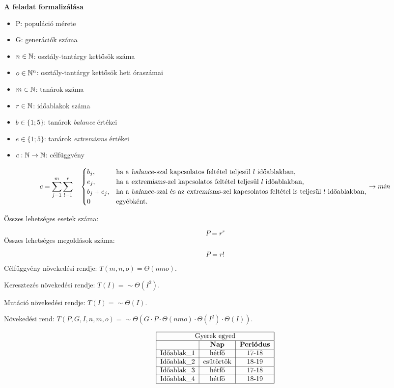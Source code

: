 \documentclass[a4paper,12pt]{article}
\begin{document}
\noindent \textbf{A feladat formalizálása}

\begin{itemize}
    \item P: populáció mérete
    \item G: generációk száma
    \item $n \in \Bbb{N}$: osztály-tantárgy kettősök száma
    \item $o \in \Bbb{N}^n$: osztály-tantárgy kettősök heti óraszámai
    \item $m \in \Bbb{N}$: tanárok száma
    \item $r \in \Bbb{N}$: időablakok száma
    \item $b \in \{1;5\}$: tanárok \textsl{balance} értékei
    \item $e \in \{1;5\}$: tanárok \textsl{extremisms} értékei
    \item $c: \Bbb{N} \rightarrow \Bbb{N}$: célfüggvény
\end{itemize}

$$ c=\sum_{j=1}^m \sum_{l=1}^r \quad
\begin{cases}
b_j, & \hbox{ha a \textsl{balance}-szal kapcsolatos feltétel teljesül }l\hbox{ időablakban,}\\
e_j, & \hbox{ha a \textsl{extremisms}-zel kapcsolatos feltétel teljesül }l\hbox{ időablakban,}\\
b_j+e_j, & \hbox{ha a \textsl{balance}-szal és az \textsl{extremisms}-zel kapcsolatos feltétel is teljesül }l\hbox{ időablakban,}\\
0 & \hbox{egyébként.}
\end{cases} 
\rightarrow min$$

Összes lehetséges esetek száma:

$$P=r^r$$
Összes lehetséges megoldások száma:

$$P=r!$$

Célfüggvény növekedési rendje: $T(m,n,o)=\Theta(mno)$.

Keresztezés növekedési rendje: $T(I)=\sim \Theta(I^2)$.

Mutáció növekedési rendje: $T(I)=\sim \Theta(I)$.

Növekedési rend: $T(P,G,I,n,m,o)=\sim \Theta(G \cdot P \cdot \Theta(nmo) \cdot \Theta(I^2) \cdot \Theta(I))$.

$$
\begin{tabular}{|l|c|c|}
\hline
\multicolumn{3}{|c|}{Gyerek egyed}\\
\hline
& \bf{Nap} & \bf{Periódus}\\
\hline
Időablak\_1 & hétfő & 17-18\\
\hline
Időablak\_2 & csütörtök & 18-19\\
\hline
Időablak\_3 & hétfő & 17-18\\
\hline
Időablak\_4 & hétfő & 18-19\\
\hline
\end{tabular}
$$
\end{document}
